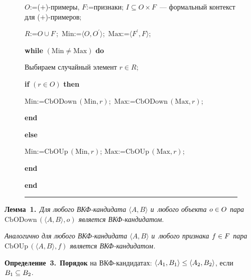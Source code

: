 \begin{multicols}{2}
\begin{figure*}[b]
{    $O$\;:=\;($+$)-примеры, $F$\;:=\;признаки; $I\subseteq O\times F$~--- 
формальный контекст для ($+$)-примеров;
    
    $R$\;:=\;$O\cup F$\,;\ $\mathrm{Min}$\;:=\;$\langle O,O^\prime\rangle$;\ 
$\mathrm{Max}$\;:=\;$\langle F^\prime, F\rangle$;
    
    \textbf{while} $(\mathrm{Min}\not= \mathrm{Max})$ \textbf{do}
    
    \hspace*{5mm}Выбираем случайный элемент $r\in R$;
    
    \hspace*{5mm}\textbf{if} $(r\in O)$ \textbf{then}
    
    \hspace*{10mm}$\mathrm{Min}$\;:=\;$\mathrm{CbODown}\,(\mathrm{Min},r)$;\ 
$\mathrm{Max}$\;:=\;$\mathrm{CbODown}\,(\mathrm{Max},r)$;
    
    \hspace*{5mm}\textbf{end}
    
    \hspace*{5mm}\textbf{else}
    
    \hspace*{10mm}$\mathrm{Min}$\;:=\;$\mathrm{CbOUp}\,(\mathrm{Min},r)$; 
$\mathrm{Max}$\;:=\;$\mathrm{CbOUp}\,(\mathrm{Max},r)$;
    
    \hspace*{5mm}\textbf{end}
    
    \textbf{end}
    
        \vspace*{4pt}
    
    \hrule
    }
    \end{figure*}
    
    \noindent
    \textbf{Лемма~1.}\ \textit{Для любого ВКФ-кандидата $\langle A, 
B\rangle$ и~любого объекта $o\hm\in O$ пара $\mathrm{CbODown}\,(\langle A,B\rangle, 
o)$ является ВКФ-кан\-ди\-да\-том}.
    
    \textit{Аналогично для любого ВКФ-кан\-ди\-да\-та $\langle A, B\rangle$ 
и~любого признака $f\hm\in F$ пара $\mathrm{CbOUp}\,(\langle A,B\rangle, f)$ является 
ВКФ-кан\-ди\-да\-том.}
    
    \smallskip
    
    \noindent
     \textbf{Определение~3.}\ \textbf{Порядок} на ВКФ-кан\-ди\-да\-тах: $\langle A_1, 
B_1\rangle \hm\leq \langle A_2, B_2\rangle$, если $B_1\hm\subseteq B_2$.
     
     \smallskip
     

\end{multicols}
